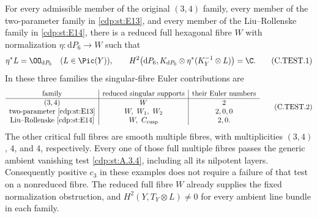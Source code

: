 
\begin{proposition}\label{cdp:st:C4g}
For every admissible member of the original $(3,4)$ family,
every member of the two-parameter family in \ref{cdp:st:E13}, and every
member of the Liu--Rollenske family in \ref{cdp:st:E14}, there is a reduced
full hexagonal fibre $W$ with normalization
$\eta:\mathrm dP_6\to W$ such that
\[
 \eta^*L=\OO_{\mathrm dP_6}\quad(L\in\Pic(Y)),\qquad
 H^2\bigl(\mathrm dP_6,K_{\mathrm dP_6}\otimes
                    \eta^*(K_Y^{-1}\otimes L)\bigr)=\C.
 \tag{C.TEST.1}\label{cdp:eq:C.TEST.1}
\]
In these three families the singular-fibre Euler contributions are
\[
\begin{array}{c|c|c}
\text{family}&\text{reduced singular supports}&
                 \text{their Euler numbers}\\ \hline
(3,4)&W&2\\
\text{two-parameter \ref{cdp:st:E13}}&W,\ W_1,\ W_2&2,0,0\\
\text{Liu--Rollenske \ref{cdp:st:E14}}&W,\ C_{\rm cusp}&2,0 .
\end{array}
\tag{C.TEST.2}\label{cdp:eq:C.TEST.2}
\]
The other critical full fibres are smooth multiple fibres,
with multiplicities $(3,4)$, $4$, and $4$, respectively.
Every one of those full multiple fibres passes the generic
ambient vanishing test \ref{cdp:st:A.3.4}, including all its nilpotent
layers. Consequently positive $c_3$ in these examples does
not require a failure of that test on a nonreduced fibre.
The reduced full fibre $W$ already supplies the fixed
normalization obstruction, and $H^2(Y,T_Y\otimes L)\ne0$
for every ambient line bundle in each family.
\end{proposition}
